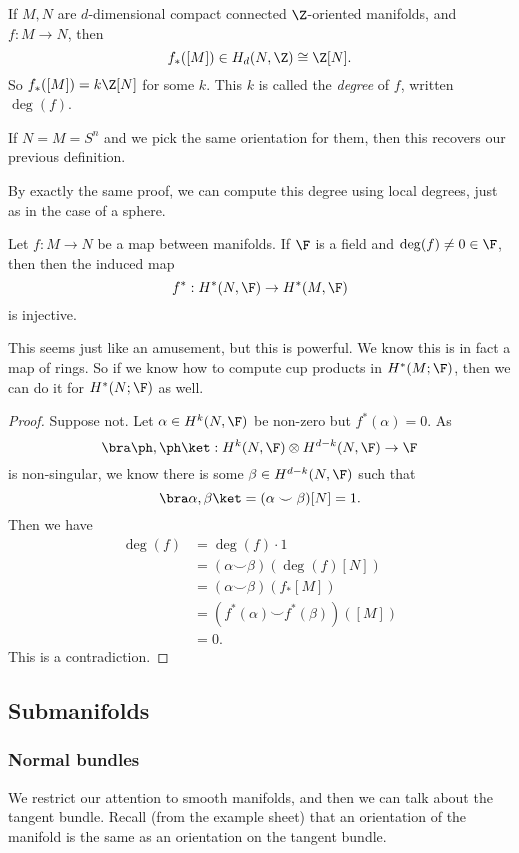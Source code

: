 \documentclass[a4paper]{article}
\begin{document}
\begin{defi}
  If $M, N$ are $d$-dimensional compact connected $\Z$-oriented manifolds, and $f: M \to N$, then
  \[
    f_*([M]) \in H_d(N, \Z) \cong \Z[N].
  \]
  So $f_*([M]) = k \Z[N]$ for some $k$. This $k$ is called the \emph{degree} of $f$, written $\deg (f)$.
\end{defi}

If $N = M = S^n$ and we pick the same orientation for them, then this recovers our previous definition.

By exactly the same proof, we can compute this degree using local degrees, just as in the case of a sphere.

\begin{cor}
  Let $f: M \to N$ be a map between manifolds. If $\F$ is a field and $\deg(f) \not= 0 \in \F$, then then the induced map
  \[
    f^*: H^*(N, \F) \to H^*(M, \F)
  \]
  is injective.
\end{cor}
This seems just like an amusement, but this is powerful. We know this is in fact a map of rings. So if we know how to compute cup products in $H^*(M; \F)$, then we can do it for $H^*(N; \F)$ as well.

\begin{proof}
  Suppose not. Let $\alpha \in H^k(N, \F)$ be non-zero but $f^*(\alpha) = 0$. As
  \[
    \bra \ph, \ph \ket: H^k(N, \F) \otimes H^{d - k}(N, \F) \to \F
  \]
  is non-singular, we know there is some $\beta \in H^{d - k}(N, \F)$ such that
  \[
    \bra \alpha, \beta\ket = (\alpha \smile \beta)[N] = 1.
  \]
  Then we have
  \begin{align*}
    \deg(f) &= \deg (f) \cdot 1 \\
    &= (\alpha \smile \beta)(\deg(f) [N]) \\
    &= (\alpha \smile \beta) (f_*[M]) \\
    &= (f^*(\alpha) \smile f^*(\beta))([M])\\
    &= 0.
  \end{align*}
  This is a contradiction.
\end{proof}

\subsection{Submanifolds}
\subsubsection*{Normal bundles}
We restrict our attention to smooth manifolds, and then we can talk about the tangent bundle. Recall (from the example sheet) that an orientation of the manifold is the same as an orientation on the tangent bundle.
\end{document}
